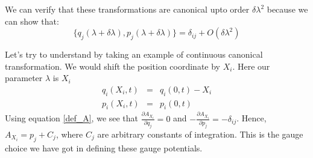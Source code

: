 \documentclass[11pt,a4paper]{article}
\begin{document}
We can verify that these transformations are canonical upto order $\delta \lambda ^2$ because we can show that:
\begin{equation}
\{q_j(\lambda + \delta \lambda), p_j(\lambda + \delta \lambda)\} = \delta_{ij} + O(\delta \lambda ^2)
\end{equation}

Let's try to understand by taking an example of continuous canonical transformation. We would shift the position coordinate by $X_i$. Here our parameter $\lambda$ is $X_i$
\begin{eqnarray}
 q_i(X_i,t) &=& q_i(0,t) - X_i \\
p_i(X_i,t)&=& p_i(0,t)
\end{eqnarray}
Using equation \ref{def_A}, we see that $\frac{\partial A_{X_i}}{\partial q_j}=0$ and $-\frac{\partial A_{X_i}}{\partial p_j}=-\delta_{ij}$. Hence, $A_{X_i}=p_j + C_j$, where $C_j$ are arbitrary constants of integration. This is the gauge choice we have got in defining these gauge potentials. 
\end{document}
